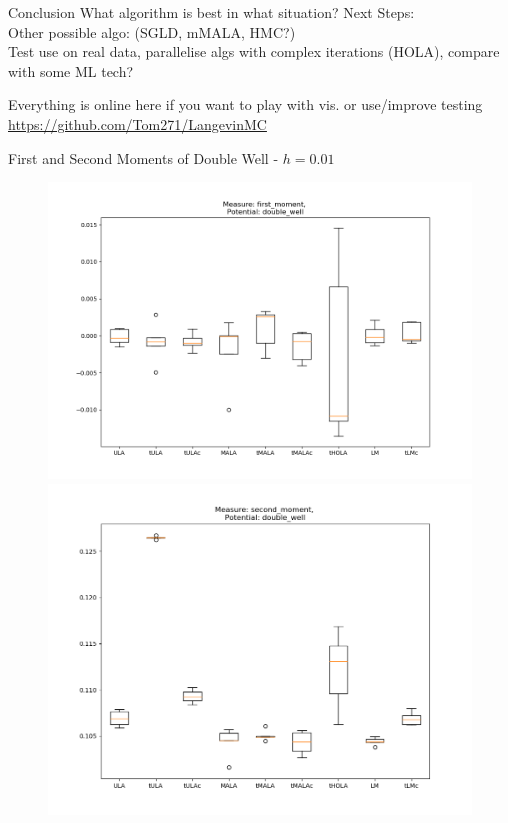 \documentclass[aspectratio=169]{beamer}
\begin{document}
\begin{frame}{Conclusion}
    What algorithm is best in what situation?
    Next Steps:\\
    Other possible algo: (SGLD, mMALA, HMC?)\\
    Test use on real data, parallelise algs with complex iterations (HOLA), compare with some ML tech?
    
\end{frame}
\begin{frame}{}
    Everything is online here if you want to play with vis. or use/improve testing
    \url{https://github.com/Tom271/LangevinMC}
\end{frame}
\begin{frame}{First and Second Moments of Double Well - \(h=0.01\)}%
        \begin{figure}[h]
        \centering
        \begin{minipage}{0.5\linewidth}
          \centering
          \includegraphics[width=0.99\linewidth]{10sBoxPlot1moment100dim001step.png}
        \end{minipage}%
        \begin{minipage}{0.5\linewidth}
          \centering
          \includegraphics[width=0.99\linewidth]{10sBoxPlot2moment100dim001step.png}
        \end{minipage}%
        \end{figure}
\end{frame}
\end{document}
